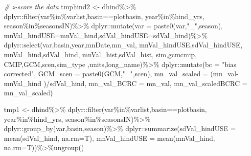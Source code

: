 \documentclass[
]{article}
\newenvironment{Shaded}{\begin{snugshade}}{\end{snugshade}}
\newcommand{\AttributeTok}[1]{\textcolor[rgb]{0.77,0.63,0.00}{#1}}
\newcommand{\CommentTok}[1]{\textcolor[rgb]{0.56,0.35,0.01}{\textit{#1}}}
\newcommand{\FunctionTok}[1]{\textcolor[rgb]{0.00,0.00,0.00}{#1}}
\newcommand{\NormalTok}[1]{#1}
\newcommand{\OtherTok}[1]{\textcolor[rgb]{0.56,0.35,0.01}{#1}}
\newcommand{\SpecialCharTok}[1]{\textcolor[rgb]{0.00,0.00,0.00}{#1}}
\newcommand{\StringTok}[1]{\textcolor[rgb]{0.31,0.60,0.02}{#1}}
\begin{document}
\begin{Shaded}
\begin{Highlighting}[]
         \CommentTok{\# z{-}score the data}
\NormalTok{       tmphind2    }\OtherTok{\textless{}{-}}\NormalTok{ dhind}\SpecialCharTok{\%\textgreater{}\%}
\NormalTok{         dplyr}\SpecialCharTok{::}\FunctionTok{filter}\NormalTok{(var}\SpecialCharTok{\%in\%}\NormalTok{varlist,basin}\SpecialCharTok{==}\NormalTok{plotbasin,}
\NormalTok{                       year}\SpecialCharTok{\%in\%}\NormalTok{hind\_yrs,}
\NormalTok{                       season}\SpecialCharTok{\%in\%}\NormalTok{seasonsIN)}\SpecialCharTok{\%\textgreater{}\%}
\NormalTok{         dplyr}\SpecialCharTok{::}\FunctionTok{mutate}\NormalTok{(}\AttributeTok{var =} \FunctionTok{paste0}\NormalTok{(var,}\StringTok{"\_"}\NormalTok{,season),}
                       \AttributeTok{mnVal\_hindUSE=}\NormalTok{mnVal\_hind,}\AttributeTok{sdVal\_hindUSE=}\NormalTok{sdVal\_hind)}\SpecialCharTok{\%\textgreater{}\%}
\NormalTok{          dplyr}\SpecialCharTok{::}\FunctionTok{select}\NormalTok{(var,basin,year,mnDate,mn\_val, }
\NormalTok{                        mnVal\_hindUSE,sdVal\_hindUSE,}
\NormalTok{                       mnVal\_hind,sdVal\_hind, mnVal\_hist,sdVal\_hist, sim,gcmcmip,}
\NormalTok{                       CMIP,GCM,scen,sim\_type ,units,long\_name)}\SpecialCharTok{\%\textgreater{}\%}
\NormalTok{         dplyr}\SpecialCharTok{::}\FunctionTok{mutate}\NormalTok{(}\AttributeTok{bc =} \StringTok{"bias corrected"}\NormalTok{,}
                       \AttributeTok{GCM\_scen =} \FunctionTok{paste0}\NormalTok{(GCM,}\StringTok{"\_"}\NormalTok{,scen),}
                       \AttributeTok{mn\_val\_scaled =}\NormalTok{ (mn\_val}\SpecialCharTok{{-}}\NormalTok{mnVal\_hind )}\SpecialCharTok{/}\NormalTok{sdVal\_hind,}
                       \AttributeTok{mn\_val\_BCRC =}\NormalTok{ mn\_val,}
                       \AttributeTok{mn\_val\_scaledBCRC =}\NormalTok{ mn\_val\_scaled)}
       
\NormalTok{       tmp1 }\OtherTok{\textless{}{-}}\NormalTok{ dhind}\SpecialCharTok{\%\textgreater{}\%}
\NormalTok{         dplyr}\SpecialCharTok{::}\FunctionTok{filter}\NormalTok{(var}\SpecialCharTok{\%in\%}\NormalTok{varlist,basin}\SpecialCharTok{==}\NormalTok{plotbasin,}
\NormalTok{                       year}\SpecialCharTok{\%in\%}\NormalTok{hind\_yrs,}
\NormalTok{                       season}\SpecialCharTok{\%in\%}\NormalTok{seasonsIN)}\SpecialCharTok{\%\textgreater{}\%}
\NormalTok{         dplyr}\SpecialCharTok{::}\FunctionTok{group\_by}\NormalTok{(var,basin,season)}\SpecialCharTok{\%\textgreater{}\%}
\NormalTok{         dplyr}\SpecialCharTok{::}\FunctionTok{summarize}\NormalTok{(}\AttributeTok{sdVal\_hindUSE =} \FunctionTok{mean}\NormalTok{(sdVal\_hind, }\AttributeTok{na.rm=}\NormalTok{T),}
                          \AttributeTok{mnVal\_hindUSE =} \FunctionTok{mean}\NormalTok{(mnVal\_hind, }\AttributeTok{na.rm=}\NormalTok{T))}\SpecialCharTok{\%\textgreater{}\%}\FunctionTok{ungroup}\NormalTok{()}
       

\end{Highlighting}
\end{Shaded}
\end{document}
